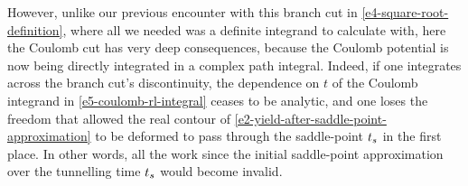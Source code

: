 However, unlike our previous encounter with this branch cut in \eqref{e4-square-root-definition}, where all we needed was a definite integrand to calculate with, here the Coulomb cut has very deep consequences, because the Coulomb potential is now being directly integrated in a complex path integral. Indeed, if one integrates across the branch cut's discontinuity, the dependence on $t$ of the Coulomb integrand in \eqref{e5-coulomb-rl-integral} ceases to be analytic, and one loses the freedom that allowed the real contour of \eqref{e2-yield-after-saddle-point-approximation} to be deformed to pass through the saddle-point ${t_s}$ in the first place. In other words, all the work since the initial saddle-point approximation over the tunnelling time ${t_s}$ would become invalid.



\captionsetup[figure]{position=auto}

